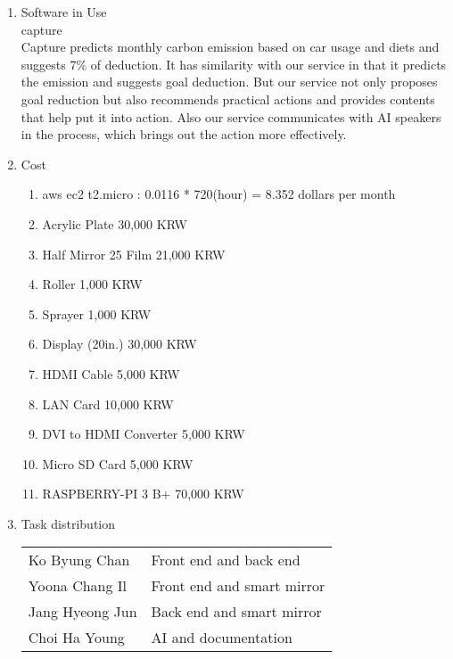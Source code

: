 \documentclass[11pt, conference]{IEEEtran}
\begin{document}
\begin{enumerate}[label=\arabic*]
    \item {\large{Software in Use}}\\
    capture\\
    Capture predicts monthly carbon emission based on car usage and diets and suggests 7\% of deduction. It has similarity with our service in that it predicts the emission and suggests goal deduction. But our service not only proposes goal reduction but also recommends practical actions and provides contents that help put it into action. Also our service communicates with AI speakers in the process, which brings out the action more effectively. \\
    
    \item {\large{Cost}}
    \begin{enumerate}[label=\alph*]
        \item aws ec2  t2.micro : 0.0116 * 720(hour) = 8.352 dollars per month
        \item Acrylic Plate 30,000 KRW
        \item Half Mirror 25 Film 21,000 KRW
        \item Roller 1,000 KRW
        \item Sprayer 1,000 KRW
        \item Display (20in.) 30,000 KRW
        \item HDMI Cable 5,000 KRW
        \item LAN Card 10,000 KRW
        \item DVI to HDMI Converter 5,000 KRW
        \item Micro SD Card 5,000 KRW
        \item RASPBERRY-PI 3 B+ 70,000 KRW\\
    \end{enumerate}
    
    \item {\large{Task distribution}}
    \begin{table}[H]
    \centering
    \begin{tabular}{m{3cm}|m{4cm}}
    \toprule
    Ko Byung Chan & Front end and back end \\
    Yoona Chang Il & Front end and smart mirror\\
    Jang Hyeong Jun & Back end and smart mirror\\
    Choi Ha Young & AI and documentation\\
    \bottomrule
    \end{tabular}
    \end{table}
\end{enumerate}
\end{document}

